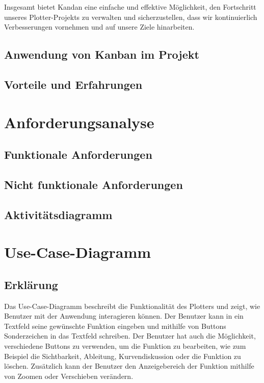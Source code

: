 \documentclass[a4paper]{article}
\begin{document}
Insgesamt bietet Kandan eine einfache und effektive Möglichkeit, den Fortschritt unseres Plotter-Projekts zu verwalten und sicherzustellen, dass wir kontinuierlich Verbesserungen vornehmen und auf unsere Ziele hinarbeiten.

\subsection{Anwendung von Kanban im Projekt}

\subsection{Vorteile und Erfahrungen}

\section{Anforderungsanalyse}

\subsection{Funktionale Anforderungen}

\subsection{Nicht funktionale Anforderungen}

\subsection{Aktivitätsdiagramm}

\newpage

\section{Use-Case-Diagramm}

\subsection{Erklärung}

Das Use-Case-Diagramm beschreibt die Funktionalität des Plotters und zeigt, wie Benutzer mit der Anwendung interagieren können. Der Benutzer kann in ein Textfeld seine gewünschte Funktion eingeben und mithilfe von Buttons Sonderzeichen in das Textfeld schreiben. Der Benutzer hat auch die Möglichkeit, verschiedene Buttons zu verwenden, um die Funktion zu bearbeiten, wie zum Beispiel die Sichtbarkeit, Ableitung, Kurvendiskussion oder die Funktion zu löschen. Zusätzlich kann der Benutzer den Anzeigebereich der Funktion mithilfe von Zoomen oder Verschieben verändern.
\end{document}

